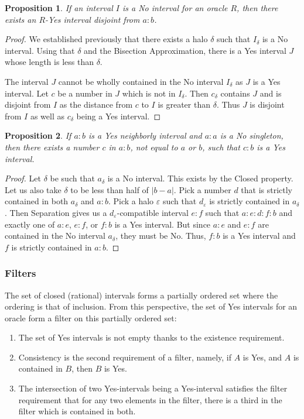 \documentclass[12pt]{article}
\newtheorem{proposition}{Proposition}[subsection]
\begin{document}
\begin{proposition}\label{pr:no-is-disjoint}
    If an interval $I$ is a No interval for an oracle $R$, then there exists an $R$-Yes interval disjoint from $a:b$.
\end{proposition}

\begin{proof}
    We established previously that there exists a halo $\delta$ such that $I_\delta$ is a No interval. Using that $\delta$ and the Bisection Approximation, there is a Yes interval $J$ whose length is less than $\delta$.

    The interval $J$ cannot be wholly contained in the No interval $I_\delta$ as $J$ is a Yes interval. Let $c$ be a number in $J$ which is not in $I_\delta$. Then $c_\delta$ contains $J$ and is disjoint from $I$ as the distance from $c$ to $I$ is greater than $\delta$. Thus $J$ is disjoint from $I$ as well as $c_\delta$ being a Yes interval. 
\end{proof}



\begin{proposition}\label{pr:exclude-singleton}
    If $a : b$ is a Yes neighborly interval  and $a:a$ is a No singleton, then there exists a number $c$ in $a:b$, not equal to $a$ or $b$, such that $c : b$ is a Yes interval.
\end{proposition}

\begin{proof}
    Let $\delta$ be such that $a_\delta$ is a No interval. This exists by the Closed property. Let us also take $\delta$ to be less than half of $|b-a|$. Pick a number $d$ that is strictly contained in both $a_\delta$ and $a:b$. Pick a halo $\varepsilon$ such that $d_\varepsilon$ is strictly contained in $a_\delta$. Then Separation gives us a $d_\varepsilon$-compatible interval $e:f$ such that $a:e:d:f:b$ and exactly one of $a:e$, $e:f$, or $f:b$ is a Yes interval. But since $a:e$ and $e:f$ are contained in the No interval $a_\delta$, they must be No. Thus, $f:b$ is a Yes interval and $f$ is strictly contained in $a:b$.
\end{proof}

\subsubsection{Filters}

The set of closed (rational) intervals forms a partially ordered set where the ordering is that of inclusion. From this perspective, the set of Yes intervals for an oracle form a filter on this partially ordered set: 
\begin{enumerate}
    \item The set of Yes intervals is not empty thanks to the existence requirement. 
    \item Consistency is the second requirement of a filter, namely, if $A$ is Yes, and $A$ is contained in $B$, then $B$ is Yes.
    \item The intersection of two Yes-intervals being a Yes-interval satisfies the filter requirement that for any two elements in the filter, there is a third in the filter which is contained in both. 
\end{enumerate}
\end{document}
